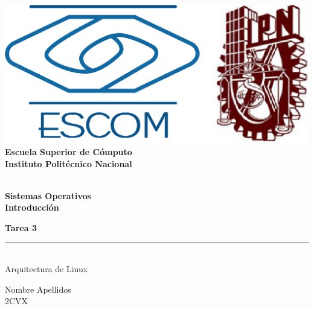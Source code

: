 
\begin{titlepage} %

    \begin{flushright}

	   \includegraphics[scale=0.15]{imagenes/escom-ipn.png}
	   \large \textbf{\\Escuela Superior de C\'omputo}
	   \large \textbf{\\Instituto Polit\'ecnico Nacional }%

	   \vspace{2.5cm} %

	   \large \textbf{\\Sistemas Operativos}%
	   \large \textbf{\\Introducción}%

	   \vspace{1.2cm} %

	   \large \textbf{Tarea 3}\\%
	   \rule{5cm}{3pt} %
	   \large{\\ Arquitectura de Linux} %

	   \vspace{2.5cm} %

	   Nombre Apellidos \\ %
	   2CVX %

	   \vspace{2.5cm} %

	   \date{\today}

    \end{flushright}

\end{titlepage}

